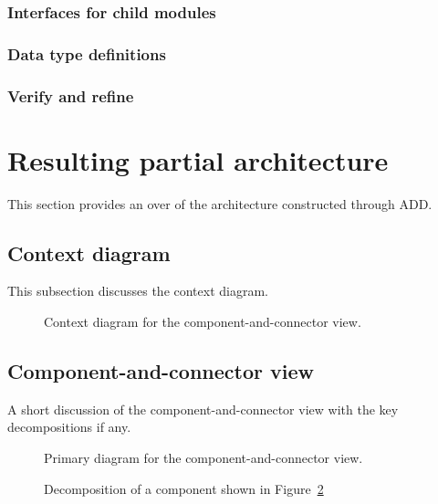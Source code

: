 \documentclass[a4paper,10pt]{article}
\begin{document}
\subsubsection{Interfaces for child modules}
\subsubsection{Data type definitions}
\subsubsection{Verify and refine}

\section{Resulting partial architecture}\label{sec:architecture}
This section provides an over of the architecture constructed through ADD\@.

\subsection{Context diagram}
This subsection discusses the context diagram.

\begin{figure}[!htp]
    \centering
    \caption{Context diagram for the component-and-connector view.
        }\label{fig:cc_context}
\end{figure}

\subsection{Component-and-connector view}
A short discussion of the component-and-connector view with the key
decompositions if any.

\begin{figure}[!htp]
    \centering
    \caption{Primary diagram for the component-and-connector view.
        }\label{fig:cc_main}
\end{figure}

\begin{figure}[!htp]
    \centering
    \caption{Decomposition of a component shown in Figure~\ref{fig:cc_main}
        }\label{fig:decomp_decomp1}
\end{figure}
\end{document}
